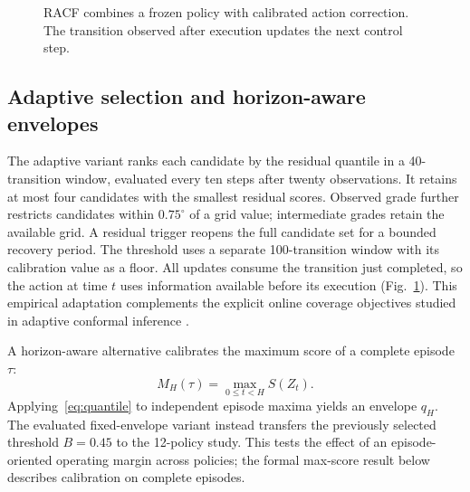 \begin{figure}[t]
\centering
{}
\caption{RACF combines a frozen policy with calibrated action correction.
The transition observed after execution updates the next control step.}
\label{fig:method}
\end{figure}

\subsection{Adaptive selection and horizon-aware envelopes}
The adaptive variant ranks each candidate by the residual quantile in a
40-transition window, evaluated every ten steps after twenty observations.
It retains at most four candidates with the smallest residual scores.
Observed grade further restricts candidates within $0.75^\circ$ of a grid
value; intermediate grades retain the available grid. A residual trigger
reopens the full candidate set for a bounded recovery period. The threshold
uses a separate 100-transition window with its calibration value as a floor.
All updates consume the transition just completed, so the action at time
$t$ uses information available before its execution (Fig.~\ref{fig:method}).
This empirical adaptation complements the explicit online coverage objectives
studied in adaptive conformal inference \cite{gibbs2021adaptive}.

A horizon-aware alternative calibrates the maximum score of a complete
episode $\tau$:
\begin{equation}
 M_H(\tau)=\max_{0\leq t<H} S(Z_t).
 \label{eq:maxscore}
\end{equation}
Applying~\eqref{eq:quantile} to independent episode maxima yields an
envelope $q_H$. The evaluated fixed-envelope variant instead transfers the
previously selected threshold $B=0.45$ to the 12-policy study. This tests the
effect of an episode-oriented operating margin across policies; the formal
max-score result below describes calibration on complete episodes.
